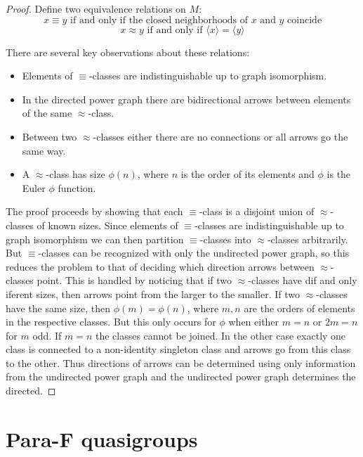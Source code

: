 \documentclass[12pt]{report}
\theoremstyle{definition}
\begin{document}
\begin{proof}
  Define two equivalence relations on $M$:
    \[x\equiv y\text{ if and only if the closed neighborhoods of $x$ and $y$ coincide}\]
    \[x\approx y\text{ if and only if }\langle x\rangle = \langle y\rangle\]

  There are several key observations about these relations:
  \begin{itemize}
    \item Elements of $\equiv$-classes are indistinguishable up to graph isomorphism.
    \item In the directed power graph there are bidirectional arrows between elements of
      the same $\approx$-class.
    \item Between two $\approx$-classes either there are no connections or all arrows go the same way.
    \item A $\approx$-class has size $\phi(n)$, where $n$ is the order of its elements and $\phi$
      is the Euler $\phi$ function.
  \end{itemize}
  The proof proceeds by showing that each $\equiv$-class is a disjoint union of $\approx$-classes
    of known sizes. Since elements of $\equiv$-classes are indistinguishable up to graph isomorphism
    we can then partition $\equiv$-classes into $\approx$-classes arbitrarily. But $\equiv$-classes
    can be recognized with only the undirected power graph, so this reduces the problem to that of
    deciding which direction arrows between $\approx$-classes point. This is handled by noticing that
    if two $\approx$-classes have dif and only iferent sizes, then arrows point from the larger to the smaller.
    If two $\approx$-classes have the same size, then $\phi(m) = \phi(n)$, where $m, n$ are the orders
    of elements in the respective classes. But this only occurs for $\phi$ when either $m = n$ or
    $2m = n$ for $m$ odd. If $m = n$ the classes cannot be joined. In the other case exactly one class
    is connected to a non-identity singleton class and arrows go from this class to the other. Thus
    directions of arrows can be determined using only information from the undirected power graph and
    the undirected power graph determines the directed.
\end{proof}


\chapter{Para-F quasigroups}
\end{document}
